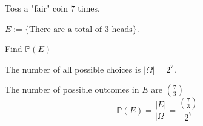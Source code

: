 \documentclass[10pt, a4paper]{article}
\begin{document}
\begin{example}
    Toss a "fair" coin $7$ times.

    $E := \{\text{There are a total of $3$ heads}\}$.

    Find $\mathbb{P}(E)$

    The number of all possible choices is $|\Omega| = 2 ^ 7$.

    The number of possible outcomes in $E$ are $\binom{7}{3}$
    \[
    \mathbb{P}(E) = \frac{|E|}{|\Omega|} = \frac{\binom{7}{3}}{2 ^ 7}
    \]
\end{example}
\end{document}
